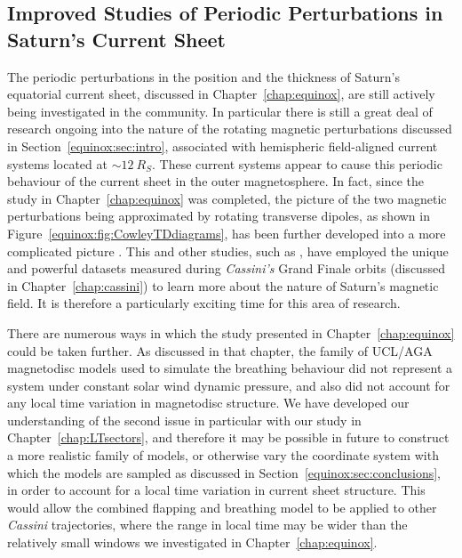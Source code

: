 \subsection{Improved Studies of Periodic Perturbations in Saturn's Current Sheet}\label{conclusions:sec:perturbations}
The periodic perturbations in the position and the thickness of Saturn's equatorial current sheet, discussed in Chapter~\ref{chap:equinox}, are still actively being investigated in the community. In particular there is still a great deal of research ongoing into the nature of the rotating magnetic perturbations discussed in Section~\ref{equinox:sec:intro}, associated with hemispheric field-aligned current systems located at ${\sim}\SI{12}{R_S}$. These current systems appear to cause this periodic behaviour of the current sheet in the outer magnetosphere. In fact, since the study in Chapter~\ref{chap:equinox} was completed, the picture of the two magnetic perturbations being approximated by rotating transverse dipoles, as shown in Figure~\ref{equinox:fig:CowleyTDdiagrams}, has been further developed into a more complicated picture \citep[see][Figure 13]{provan2018}. This and other studies, such as \citet{dougherty2018}, have employed the unique and powerful datasets measured during \textit{Cassini's} Grand Finale orbits (discussed in Chapter~\ref{chap:cassini}) to learn more about the nature of Saturn's magnetic field. It is therefore a particularly exciting time for this area of research.

There are numerous ways in which the study presented in Chapter~\ref{chap:equinox} could be taken further. As discussed in that chapter, the family of UCL/AGA magnetodisc models used  to simulate the breathing behaviour did not represent a system under constant solar wind dynamic pressure, and also did not account for any local time variation in magnetodisc structure. We have developed our understanding of the second issue  in particular with our study in Chapter~\ref{chap:LTsectors}, and therefore it may be possible in future to construct a more realistic family  of models, or otherwise vary the coordinate system with which the models are sampled as discussed in Section~\ref{equinox:sec:conclusions}, in order to account for a local time variation in current sheet structure. This would allow the combined flapping and breathing model to be applied to other \textit{Cassini} trajectories, where the range in local time may be wider than the relatively small windows we investigated in Chapter~\ref{chap:equinox}.

